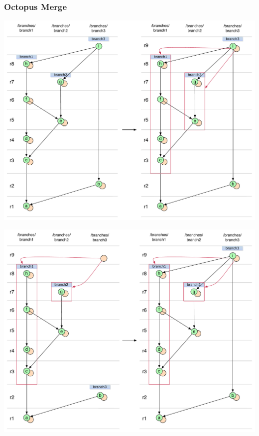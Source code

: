 \subsubsection{Octopus Merge}

\begin{center}
\includegraphics[width=\textwidth]{img/diagrams/octopus_merge_git_to_svn.pdf}%
\label{octopus_merge_git_to_svn}%
\end{center}

\begin{center}
\includegraphics[width=\textwidth]{img/diagrams/octopus_merge_svn_to_git.pdf}%
\label{octopus_merge_svn_to_git}%
\end{center}
